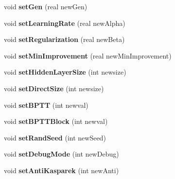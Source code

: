 \begin{DoxyCompactItemize}
\mbox{\label{class_c_rnn_l_m_a23b6059ce1323b4edcbeb64e0b812943}} 
void {\bfseries set\+Gen} (real new\+Gen)
\item 
\mbox{\label{class_c_rnn_l_m_ab57bcc67a75a8b4efd653d1cd8052a13}} 
void {\bfseries set\+Learning\+Rate} (real new\+Alpha)
\item 
\mbox{\label{class_c_rnn_l_m_aea7c338c02e265b94cb3d9a932d6845b}} 
void {\bfseries set\+Regularization} (real new\+Beta)
\item 
\mbox{\label{class_c_rnn_l_m_ace3b58964c174b24f5885a806c9896fb}} 
void {\bfseries set\+Min\+Improvement} (real new\+Min\+Improvement)
\item 
\mbox{\label{class_c_rnn_l_m_a608da9c1bce4dc9cc71ff195c45a4c61}} 
void {\bfseries set\+Hidden\+Layer\+Size} (int newsize)
\item 
\mbox{\label{class_c_rnn_l_m_a2c9efb0398f3c659615e8ea1956ee7bd}} 
void {\bfseries set\+Direct\+Size} (int newsize)
\item 
\mbox{\label{class_c_rnn_l_m_a4a09324d50e680abc116a11aa7736aea}} 
void {\bfseries set\+B\+P\+TT} (int newval)
\item 
\mbox{\label{class_c_rnn_l_m_ad021832dfab794c85012d0c5851e3c49}} 
void {\bfseries set\+B\+P\+T\+T\+Block} (int newval)
\item 
\mbox{\label{class_c_rnn_l_m_af97a542ceffb1764eb6742b588048c6a}} 
void {\bfseries set\+Rand\+Seed} (int new\+Seed)
\item 
\mbox{\label{class_c_rnn_l_m_ae261f3b7bc389f285f56877a6ed01188}} 
void {\bfseries set\+Debug\+Mode} (int new\+Debug)
\item 
\mbox{\label{class_c_rnn_l_m_a029bf01605c10b3164215d75f0f6660f}} 
void {\bfseries set\+Anti\+Kasparek} (int new\+Anti)
\item 
\mbox{\label{class_c_rnn_l_m_ab171620cc804319366e85d5f4141a33f}} 

\end{DoxyCompactItemize}
